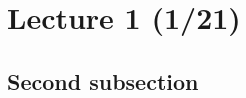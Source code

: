 
\section[Lecture 2 (Date) -- {\it Notes for Lectures on C Programming}]{Lecture 1 (1/21)}

\subsection{Second subsection}
